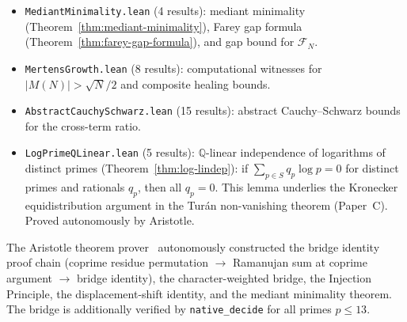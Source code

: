 \documentclass[11pt]{article}
\theoremstyle{definition}
\newcommand{\F}{\mathcal{F}}
\begin{document}
\begin{itemize}
    1~genuine \texttt{sorry}): Sign Theorem for small primes
    (\texttt{sign\_theorem\_all\_le\_113}), wobble
    monotonicity equivalence; sorry on full sign conjecture.
  \item \texttt{MediantMinimality.lean} (4 results):
    mediant minimality (Theorem~\ref{thm:mediant-minimality}),
    Farey gap formula (Theorem~\ref{thm:farey-gap-formula}),
    and gap bound for $\F_N$.
  \item \texttt{MertensGrowth.lean} (8 results):
    computational witnesses for $|M(N)| > \sqrt{N}/2$
    and composite healing bounds.
  \item \texttt{AbstractCauchySchwarz.lean} (15 results):
    abstract Cauchy--Schwarz bounds for the cross-term ratio.
  \item \texttt{LogPrimeQLinear.lean} (5 results):
    $\mathbb{Q}$-linear independence of logarithms of distinct primes
    (Theorem~\ref{thm:log-lindep}): if $\sum_{p \in S} q_p \log p = 0$
    for distinct primes and rationals $q_p$, then all $q_p = 0$.
    This lemma underlies the Kronecker equidistribution argument in
    the Turán non-vanishing theorem (Paper~C).  Proved autonomously by Aristotle.
\end{itemize}
The Aristotle theorem prover~\cite{Aristotle2025}
autonomously constructed the bridge identity proof chain
(coprime residue permutation $\to$ Ramanujan sum at coprime
argument $\to$ bridge identity), the character-weighted
bridge, the Injection Principle, the displacement-shift
identity, and the mediant minimality theorem.
The bridge is additionally verified by
\texttt{native\_decide} for all primes $p \le 13$.
\end{document}
